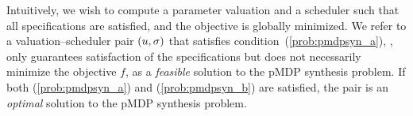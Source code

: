 \noindent Intuitively, we wish to compute a parameter valuation and a scheduler such
that all specifications are satisfied, and the objective is globally minimized.
We refer to a valuation--scheduler pair $(u,\sigma)$ that satisfies
condition~(\ref{prob:pmdpsyn_a}), \ie, only guarantees satisfaction of the
specifications but does not necessarily minimize the objective $f$, as a
\emph{feasible} solution to the pMDP synthesis problem. If both
(\ref{prob:pmdpsyn_a}) and (\ref{prob:pmdpsyn_b}) are satisfied, the pair
is an \emph{optimal} solution to the pMDP synthesis problem.




%



